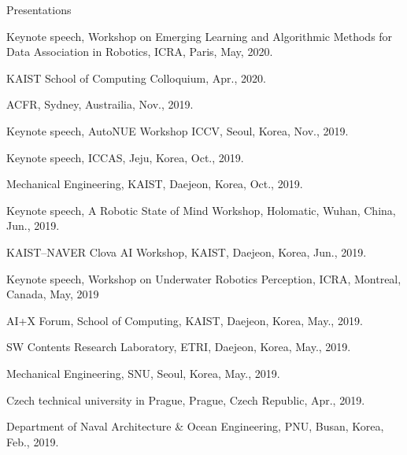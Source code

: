 \begin{rSection}{Presentations}
\begin{pubSubsectionNum}{}
  \item Keynote speech, Workshop on Emerging Learning and Algorithmic Methods for Data Association in Robotics, ICRA, Paris, May, 2020.

  \item KAIST School of Computing Colloquium, Apr., 2020.


  \item \ac{ACFR}, Sydney, Austrailia, Nov., 2019.

  \item Keynote speech, AutoNUE Workshop \ac{ICCV}, Seoul, Korea,  Nov., 2019.

  \item Keynote speech, \ac{ICCAS}, Jeju, Korea, Oct., 2019.

  \item Mechanical Engineering, \ac{KAIST}, Daejeon, Korea, Oct., 2019.

  \item Keynote speech, A Robotic State of Mind Workshop, Holomatic, Wuhan, China, Jun., 2019.

  \item KAIST--NAVER Clova AI Workshop, \ac{KAIST}, Daejeon, Korea, Jun., 2019.

  \item Keynote speech, Workshop on Underwater Robotics Perception, ICRA, Montreal, Canada, May, 2019

  \item AI+X Forum, School of Computing, \ac{KAIST}, Daejeon, Korea, May., 2019.

  \item SW Contents Research Laboratory, \ac{ETRI}, Daejeon, Korea, May., 2019.

  \item Mechanical Engineering, \ac{SNU}, Seoul, Korea, May., 2019.

  \item Czech technical university in Prague, Prague, Czech Republic, Apr., 2019.

  \item Department of Naval Architecture \& Ocean Engineering, \ac{PNU}, Busan, Korea, Feb., 2019.




\end{pubSubsectionNum}
\end{rSection}
